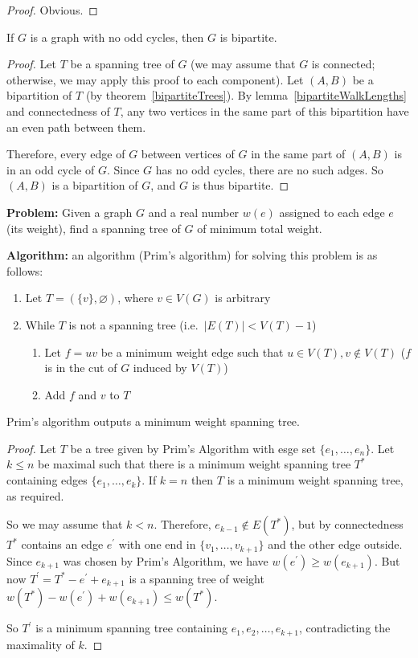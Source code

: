 \documentclass[12pt]{article}
\begin{document}
\begin{proof}
Obvious.
\end{proof}

\begin{lemma}
If $G$ is a graph with no odd cycles, then $G$ is bipartite.
\end{lemma}

\begin{proof}
Let $T$ be a spanning tree of $G$ (we may assume that $G$ is connected; otherwise, we may apply this proof to each component). Let $(A,B)$ be a bipartition of $T$ (by theorem~\ref{bipartiteTrees}). By lemma~\ref{bipartiteWalkLengths} and connectedness of $T$, any two vertices in the same part of this bipartition have an even path between them.

Therefore, every edge of $G$ between vertices of $G$ in the same part of $(A,B)$ is in an odd cycle of $G$. Since $G$ has no odd cycles, there are no such adges. So $(A,B)$ is a bipartition of $G$, and $G$ is thus bipartite.
\end{proof}

{\bf Problem:} Given a graph $G$ and a real number $w(e)$ assigned to each edge $e$ (its weight), find a spanning tree of $G$ of minimum total weight.

{\bf Algorithm:} an algorithm (Prim's algorithm) for solving this problem is as follows:
\begin{enumerate}
\item Let $T = (\{v\},\varnothing)$, where $v \in V(G)$ is arbitrary
\item While $T$ is not a spanning tree (i.e.\ $|E(T)| < V(T) -1$)
\begin{enumerate}
\item Let $f=uv$ be a minimum weight edge such that $u \in V(T), v \notin V(T)$ ($f$ is in the cut of $G$ induced by $V(T)$)
\item Add $f$ and $v$ to $T$
\end{enumerate}
\end{enumerate}

\begin{theorem}
Prim's algorithm outputs a minimum weight spanning tree.
\end{theorem}

\begin{proof}
Let $T$ be a tree given by Prim's Algorithm with esge set $\{e_1, \dots, e_n\}$. Let $k \leq n$ be maximal such that there is a minimum weight spanning tree $T^*$ containing edges $\{e_1, \dots, e_k\}$. If $k=n$ then $T$ is a minimum weight spanning tree, as required.

So we may assume that $k < n$. Therefore, $e_{k-1} \notin E(T^*)$, but by connectedness $T^*$ contains an edge $e^\prime$ with one end in $\{v_1, \dots, v_{k+1}\}$ and the other edge outside. Since $e_{k+1}$ was chosen by Prim's Algorithm, we have $w(e^\prime) \geq w(e_{k+1})$. But now $T^\prime = T^* - e^\prime + e_{k+1}$ is a spanning tree of weight $w(T^*) - w(e^\prime) + w(e_{k+1}) \leq w(T^*)$.

So $T^\prime$ is a minimum spanning tree containing $e_1, e_2, \dots, e_{k+1}$, contradicting the maximality of $k$.
\end{proof}
\end{document}
